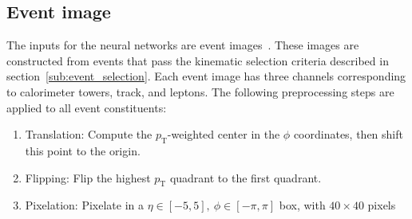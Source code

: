\documentclass[12pt]{article}
\begin{document}
    \subsection{Event image}%
    \label{sub:event_image}
        The inputs for the neural networks are event images~\cite{Kasieczka:2019dbj,deOliveira:2015xxd, Kasieczka2017nv}. These images are constructed from events that pass the kinematic selection criteria described in section~\ref{sub:event_selection}. Each event image has three channels corresponding to calorimeter towers, track, and leptons. The following preprocessing steps are applied to all event constituents:
        \begin{enumerate}
            \item Translation: Compute the $p_{\text{T}}$-weighted center in the $\phi$ coordinates, then shift this point to the origin.
            \item Flipping: Flip the highest $p_{\text{T}}$ quadrant to the first quadrant.
            \item Pixelation: Pixelate in a $\eta \in [-5, 5],\ \phi \in [-\pi, \pi]$ box, with $40 \times 40$ pixels 
        \end{enumerate}
\end{document}
